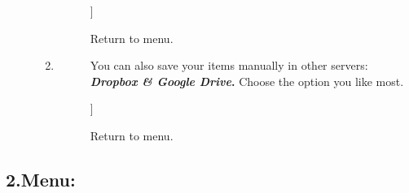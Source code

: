 \documentclass{article}
\begin{document}
\begin{description}
\begin{enumerate}
\begin{description}
												]
													 
													Return to menu.
												
											\end{description}
											
										
											\item 
											\begin{description}
											\item[\textbf{ \emph{ \paragraph*{Extra Server }}}
												]
												\par You can also save your items manually in other servers: 
												\textbf{\emph{Dropbox \& Google Drive}.}
												Choose the option you like most.
												
												]
													 
													Return to menu.
												
											\end{description}
											
										\end{enumerate}
									 
								
						\end{description}
					
			
			
			
			
				\subsection*{ 2.Menu:}
				
\end{document}
